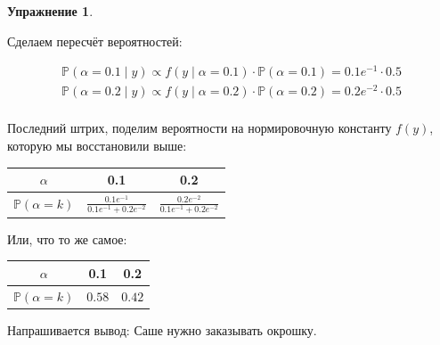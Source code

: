 \documentclass[12pt, a4paper, oneside]{extreport}
\def \mbb{\mathbb}
\def \PP{\mbb{P}}
\theoremstyle{plain}              %
\theoremstyle{definition}         %
\newtheorem{problem}{\color{myblue} Упражнение}
\begin{document}
\begin{problem}
\begin{sol}
		
		Сделаем пересчёт вероятностей: 
		
		\begin{equation*}
		\begin{aligned}
		\PP(\alpha = 0.1 \mid y) \propto f(y \mid \alpha = 0.1) \cdot \PP(\alpha = 0.1) = 0.1 e^{-1} \cdot 0.5 \\ 
		\PP(\alpha = 0.2 \mid y) \propto  f(y \mid \alpha = 0.2) \cdot \PP(\alpha = 0.2) = 0.2 e^{-2} \cdot 0.5\\
		\end{aligned}
		\end{equation*}
		
		Последний штрих, поделим вероятности на нормировочную константу $f(y)$, которую мы восстановили выше:
		
		\begin{center}
			\begin{tabular}{c|c|c}
				$\alpha$ & 0.1 & 0.2 \\ \hline
				$\PP(\alpha= k)$ & $\frac{0.1 e^{-1}}{0.1 e^{-1} + 0.2 e^{-2}}$ & $\frac{0.2 e^{-2}}{0.1 e^{-1} + 0.2 e^{-2}}$ \\ 
			\end{tabular}
		\end{center}
		
		Или, что то же самое: 
		
		\begin{center}
			\begin{tabular}{c|c|c}
				$\alpha$ & 0.1 & 0.2 \\ \hline
				$\PP(\alpha= k)$ & $0.58$ & $0.42$ \\ 
			\end{tabular}
		\end{center}
		
		Напрашивается вывод: Саше нужно заказывать окрошку.  
		
	\end{sol}
\end{problem}
\end{document}
